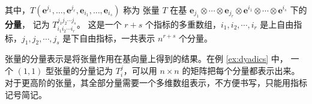 \begin{definition}[张量的分量表示]
\begin{align*}
    \end{align*}
    其中，$T(\mathbf{e}^{j_1},\ldots,\mathbf{e}^{j_r},\mathbf{e}_{i_1},\ldots,\mathbf{e}_{i_s})$ 称为
    张量 $T$ 在基 $\mathbf{e}_{j_1} \otimes \cdots \otimes \mathbf{e}_{j_r} \otimes \mathbf{e}^{i_1} \otimes \cdots \otimes \mathbf{e}^{i_s}$ 下的\textbf{分量}，
    记为 $T_{i_1 i_2 \cdots i_r}^{j_1 j_2 \cdots j_s}$。
    这是一个 $r+s$ 个指标的多重数组，$i_1,i_2,\cdots,i_r$ 是上自由指标，$j_1,j_2,\cdots,j_s$ 是下自由指标，一共表示 $n^{r+s}$ 个分量。
\end{definition}

\begin{note}
    张量的分量表示是将张量作用在基向量上得到的结果。在例 \ref{ex:dyadics} 中，
    一个 $(1,1)$ 型张量的分量记为 $T^j_i$，可以用 $n\times n$ 的矩阵把每个分量都表示出来。
    对于更高阶的张量，其全部分量需要一个多维数组表示，不方便书写，只能用指标记号简记。
\end{note}

\vspace{1em}

